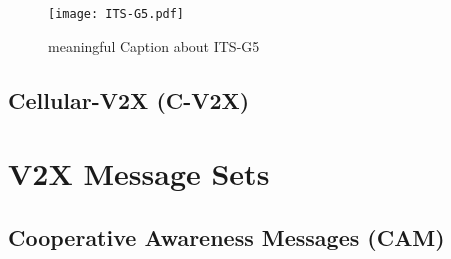 



\begin{figure}[H]
    \centering
    \texttt{[image: ITS-G5.pdf]}
    \caption{meaningful Caption about ITS-G5}
    \label{fig:iso-its-g5}
\end{figure}





\subsection{Cellular-V2X (C-V2X)}

                    




\newpage

\section{V2X Message Sets}


\subsection{Cooperative Awareness Messages (CAM)}

